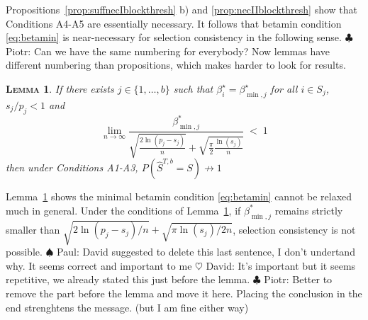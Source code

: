 \documentclass[aos]{imsart}
\theoremstyle{plain}
\newtheorem{lem}{\textsc{Lemma}}[section]
\newcommand{\david}[1]{{\small{\color{blue} \sf $\heartsuit$ David: #1}}}
\newcommand{\piotr}[1]{{\small{\color{red} \sf $\clubsuit$ Piotr: #1}}}
\newcommand{\paul}[1]{{\small{\color{green} \sf $\spadesuit$ Paul: #1}}}
\begin{document}
Propositions~\ref{prop:suffnecIblockthresh} b) and \ref{prop:necIIblockthresh} show that Conditions A4-A5 are essentially necessary. It follows that betamin condition \eqref{eq:betamin} is near-necessary for selection consistency in the following sense.
\piotr{Can we have the same numbering for everybody? Now lemmas have different numbering than propositions, which makes harder to look for results.}
\begin{lem}\label{lem:necbetaminblockthresh}
    If there exists $j\in\{1,\ldots,b\}$ such that $\beta^{\star}_i=\beta_{\min,j}^{\star}$ for all $i \in S_j$, $s_j/p_j<1$ and
    \begin{equation}\label{eq:necbetaminblockthresh}
      \lim_{n\to \infty}\frac{\beta_{\min,j}^*}{\sqrt{\tfrac{2\ln(p_j-s_j)}{n}}+\sqrt{\tfrac{\pi}{2}\tfrac{\ln(s_j)}{n}}}\;<\; 1  
    \end{equation}
then under Conditions A1-A3,\;  $P(\hat{S}^{T,b} = S)\not \to 1$
\end{lem}
Lemma~\ref{lem:necbetaminblockthresh} shows the minimal betamin condition \eqref{eq:betamin} cannot be relaxed much in general. Under the conditions of Lemma~\ref{lem:necbetaminblockthresh}, if $\beta_{\min,j}^*$ remains strictly smaller than $\sqrt{2\ln(p_j-s_j)/n}+\sqrt{\pi\ln(s_j)/2n}$, selection consistency is not possible. \paul{David suggested to delete this last sentence, I don't undertand why. It seems correct and important to me} \david{It's important but it seems repetitive, we already stated this just before the lemma.}\piotr{Better to remove the part before the lemma and move it here. Placing the conclusion in the end strenghtens the message. (but I am fine either way)}


\bigskip
\end{document}
